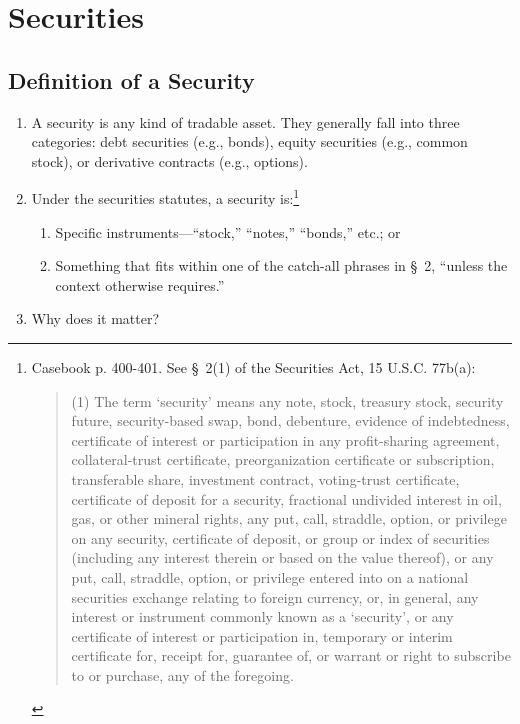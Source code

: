 \section{Securities}

\subsection{Definition of a Security}

\begin{enumerate}
    \item A security is any kind of tradable asset. They generally fall into 
    three categories: debt securities (e.g., bonds), equity securities (e.g., 
    common stock), or derivative contracts (e.g., options).
    \item Under the securities statutes, a security is:\footnote{Casebook p. 
    400-401. See \S\ 2(1) of the Securities Act, 15 U.S.C. 77b(a): 
    \blockquote{(1) The term `security' means any note, stock, treasury stock, 
    security future, security-based swap, bond, debenture, evidence of 
    indebtedness, certificate of interest or participation in any profit-sharing 
    agreement, collateral-trust certificate, preorganization certificate or 
    subscription, transferable share, investment contract, voting-trust 
    certificate, certificate of deposit for a security, fractional undivided 
    interest in oil, gas, or other mineral rights, any put, call, straddle, 
    option, or privilege on any security, certificate of deposit, or group or 
    index of securities (including any interest therein or based on the value 
    thereof), or any put, call, straddle, option, or privilege entered into on a 
    national securities exchange relating to foreign currency, or, in general, 
    any interest or instrument commonly known as a `security', or any 
    certificate of interest or participation in, temporary or interim 
    certificate for, receipt for, guarantee of, or warrant or right to subscribe 
    to or purchase, any of the foregoing.}}
    \begin{enumerate}
        \item Specific instruments---``stock,'' ``notes,'' ``bonds,'' etc.; or
        \item Something that fits within one of the catch-all phrases in \S\ 2, 
        ``unless the context otherwise requires.''
    \end{enumerate}
    \item Why does it matter?
    \begin{enumerate}

\end{enumerate}
\end{enumerate}
